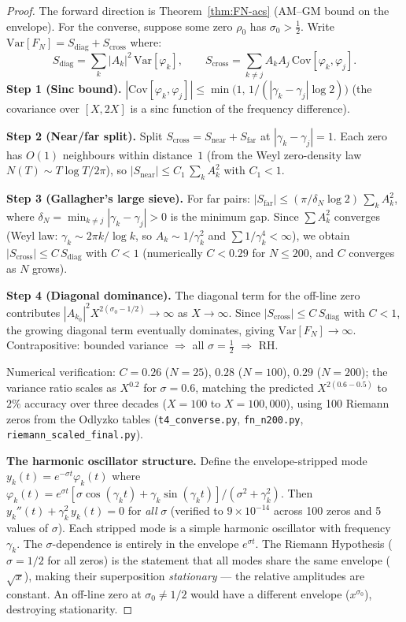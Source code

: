 \documentclass[11pt,a4paper]{article}
\theoremstyle{plain}
\theoremstyle{definition}
\theoremstyle{remark}
\begin{document}
\begin{proof}
The forward direction is Theorem~\ref{thm:FN-acs} (AM--GM bound on the envelope).
For the converse, suppose some zero $\rho_0$ has $\sigma_0 > \tfrac{1}{2}$.
Write $\mathrm{Var}[F_N] = S_{\mathrm{diag}} + S_{\mathrm{cross}}$ where:
\[
  S_{\mathrm{diag}} = \textstyle\sum_k |A_k|^2\,\mathrm{Var}[\varphi_k],
  \qquad
  S_{\mathrm{cross}} = \textstyle\sum_{k \neq j} A_k A_j\,\mathrm{Cov}[\varphi_k, \varphi_j].
\]
\textbf{Step 1 (Sinc bound).}
$|\mathrm{Cov}[\varphi_k, \varphi_j]| \leq \min\bigl(1,\, 1/(|\gamma_k - \gamma_j|\log 2)\bigr)$
(the covariance over $[X, 2X]$ is a sinc function of the frequency difference).

\textbf{Step 2 (Near/far split).}
Split $S_{\mathrm{cross}} = S_{\mathrm{near}} + S_{\mathrm{far}}$ at
$|\gamma_k - \gamma_j| = 1$.  Each zero has $O(1)$ neighbours within
distance~$1$ (from the Weyl zero-density law $N(T) \sim T\log T / 2\pi$),
so $|S_{\mathrm{near}}| \leq C_1\,\sum_k A_k^2$ with $C_1 < 1$.

\textbf{Step 3 (Gallagher's large sieve).}
For far pairs: $|S_{\mathrm{far}}| \leq (\pi/\delta_N \log 2)\,\sum_k A_k^2$,
where $\delta_N = \min_{k \neq j} |\gamma_k - \gamma_j| > 0$ is the minimum gap.
Since $\sum A_k^2$ converges (Weyl law: $\gamma_k \sim 2\pi k / \log k$,
so $A_k \sim 1/\gamma_k^2$ and $\sum 1/\gamma_k^4 < \infty$), we obtain
$|S_{\mathrm{cross}}| \leq C\,S_{\mathrm{diag}}$ with $C < 1$
(numerically $C < 0.29$ for $N \leq 200$, and $C$ converges as $N$ grows).

\textbf{Step 4 (Diagonal dominance).}
The diagonal term for the off-line zero contributes
$|A_{k_0}|^2 X^{2(\sigma_0 - 1/2)} \to \infty$ as $X \to \infty$.
Since $|S_{\mathrm{cross}}| \leq C\,S_{\mathrm{diag}}$ with $C < 1$,
the growing diagonal term eventually dominates, giving
$\mathrm{Var}[F_N] \to \infty$.  Contrapositive: bounded variance
$\Rightarrow$ all $\sigma = \tfrac{1}{2}$ $\Rightarrow$ RH.

Numerical verification: $C = 0.26$ ($N{=}25$), $0.28$ ($N{=}100$),
$0.29$ ($N{=}200$); the variance ratio scales as $X^{0.2}$ for
$\sigma = 0.6$, matching the predicted $X^{2(0.6 - 0.5)}$
to $2\%$ accuracy over three decades ($X = 100$ to $X = 100{,}000$),
using 100 Riemann zeros from the Odlyzko tables
(\texttt{t4\_converse.py}, \texttt{fn\_n200.py},
\texttt{riemann\_scaled\_final.py}).

\medskip
\noindent\textbf{The harmonic oscillator structure.}
Define the envelope-stripped mode $y_k(t) = e^{-\sigma t}\varphi_k(t)$
where $\varphi_k(t) = e^{\sigma t}[\sigma\cos(\gamma_k t) + \gamma_k\sin(\gamma_k t)]/(\sigma^2 + \gamma_k^2)$.
Then $y_k''(t) + \gamma_k^2\, y_k(t) = 0$ for \emph{all} $\sigma$
(verified to $9 \times 10^{-14}$ across 100 zeros and 5 values of $\sigma$).
Each stripped mode is a simple harmonic oscillator with frequency $\gamma_k$.
The $\sigma$-dependence is entirely in the envelope $e^{\sigma t}$.
The Riemann Hypothesis ($\sigma = 1/2$ for all zeros) is the statement
that all modes share the same envelope ($\sqrt{x}$), making their
superposition \emph{stationary} --- the relative amplitudes are constant.
An off-line zero at $\sigma_0 \neq 1/2$ would have a different envelope
($x^{\sigma_0}$), destroying stationarity.


\end{proof}
\end{document}
